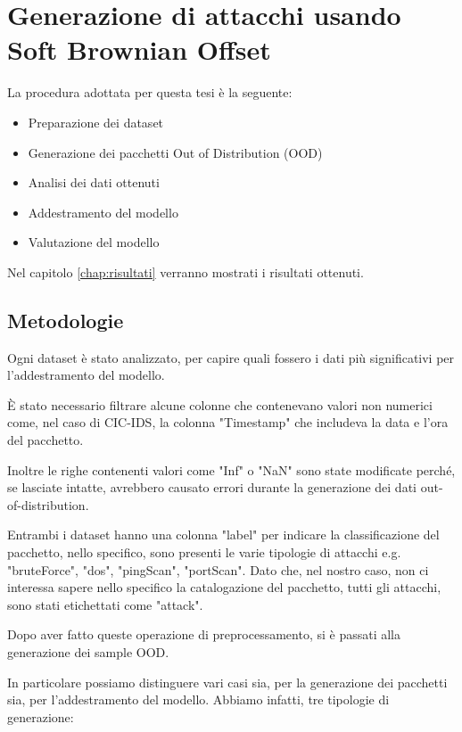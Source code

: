 \chapter{Generazione di attacchi usando Soft Brownian Offset}
\label{chap:generazione_di_attacchi_usando_sbo}

La procedura adottata per questa tesi è la seguente:

\begin{itemize}
    \item Preparazione dei dataset
    \item Generazione dei pacchetti Out of Distribution (OOD)
    \item Analisi dei dati ottenuti
    \item Addestramento del modello
    \item Valutazione del modello
\end{itemize}



Nel capitolo \ref{chap:risultati} verranno mostrati i risultati ottenuti.


\section{Metodologie}

Ogni dataset è stato analizzato, per capire quali fossero i dati più significativi per l'addestramento del modello. 

È stato necessario filtrare alcune colonne che contenevano valori non numerici come, nel caso di CIC-IDS, la colonna "Timestamp" che includeva la data e l'ora del pacchetto. 

Inoltre le righe contenenti valori come "Inf" o "NaN" sono state modificate perché, se lasciate intatte, avrebbero causato errori durante la generazione dei dati out-of-distribution.

Entrambi i dataset hanno una colonna "label" per indicare la classificazione del pacchetto, nello specifico, sono presenti le varie tipologie di attacchi e.g. "bruteForce", "dos", "pingScan", "portScan". Dato che, nel nostro caso, non ci interessa sapere nello specifico la catalogazione del pacchetto, tutti gli attacchi, sono stati etichettati come "attack".

Dopo aver fatto queste operazione di preprocessamento, si è passati alla generazione dei sample OOD.

In particolare possiamo distinguere vari casi sia, per la generazione dei pacchetti sia, per l'addestramento del modello. Abbiamo infatti, tre tipologie di generazione:

